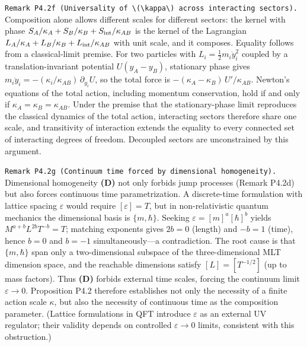 \documentclass[
]{article}
\begin{document}
\texttt{Remark\ P4.2f\ (Universality\ of\ \textbackslash{}(\textbackslash{}kappa\textbackslash{})\ across\ interacting\ sectors).}
Composition alone allows different scales for different sectors: the
kernel with phase \(S_A/\kappa_A+S_B/\kappa_B+S_{\rm int}/\kappa_{AB}\)
is the kernel of the Lagrangian
\(L_A/\kappa_A+L_B/\kappa_B+L_{\rm int}/\kappa_{AB}\) with unit scale,
and it composes. Equality follows from a classical-limit premise. For
two particles with \(L_i=\tfrac12m_i\dot y_i^2\) coupled by a
translation-invariant potential \(U(y_A-y_B)\), stationary phase gives
\(m_i\ddot y_i=-(\kappa_i/\kappa_{AB})\,\partial_{y_i}U\), so the total
force is \(-(\kappa_A-\kappa_B)\,U'/\kappa_{AB}\). Newton's equations of
the total action, including momentum conservation, hold if and only if
\(\kappa_A=\kappa_B=\kappa_{AB}\). Under the premise that the
stationary-phase limit reproduces the classical dynamics of the total
action, interacting sectors therefore share one scale, and transitivity
of interaction extends the equality to every connected set of
interacting degrees of freedom. Decoupled sectors are unconstrained by
this argument.

\texttt{Remark\ P4.2g\ (Continuum\ time\ forced\ by\ dimensional\ homogeneity).}
Dimensional homogeneity \textbf{(D)} not only forbids jump processes
(Remark P4.2d) but also forces continuous time parametrization. A
discrete-time formulation with lattice spacing \(\varepsilon\) would
require \([\varepsilon]=T\), but in non-relativistic quantum mechanics
the dimensional basis is \(\{m,\hbar\}\). Seeking
\(\varepsilon=[m]^a[\hbar]^b\) yields \(M^{a+b}L^{2b}T^{-b}=T\);
matching exponents gives \(2b=0\) (length) and \(-b=1\) (time), hence
\(b=0\) and \(b=-1\) simultaneously---a contradiction. The root cause is
that \(\{m,\hbar\}\) span only a two-dimensional subspace of the
three-dimensional MLT dimension space, and the reachable dimensions
satisfy \([L]=[T^{-1/2}]\) (up to mass factors). Thus \textbf{(D)}
forbids external time scales, forcing the continuum limit
\(\varepsilon\to 0\). Proposition P4.2 therefore establishes not only
the necessity of a finite action scale \(\kappa\), but also the
necessity of continuous time as the composition parameter. (Lattice
formulations in QFT introduce \(\varepsilon\) as an external UV
regulator; their validity depends on controlled \(\varepsilon\to 0\)
limits, consistent with this obstruction.)
\end{document}
